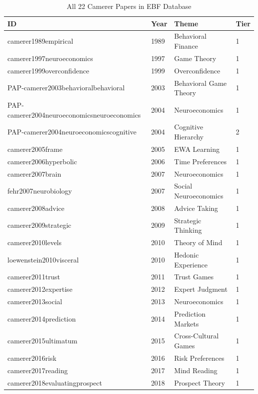 \begin{table}[htbp]
\centering
\caption{All 22 Camerer Papers in EBF Database}
\label{tab:ca-papers}
\renewcommand{\arraystretch}{1.2}
\scriptsize
\begin{tabular}{@{}llll@{}}
\toprule
\textbf{ID} & \textbf{Year} & \textbf{Theme} & \textbf{Tier} \\
\midrule
camerer1989empirical & 1989 & Behavioral Finance & 1 \\
camerer1997neuroeconomics & 1997 & Game Theory & 1 \\
camerer1999overconfidence & 1999 & Overconfidence & 1 \\
PAP-camerer2003behavioralbehavioral & 2003 & Behavioral Game Theory & 1 \\
PAP-camerer2004neuroeconomicsneuroeconomics & 2004 & Neuroeconomics & 1 \\
PAP-camerer2004neuroeconomicscognitive & 2004 & Cognitive Hierarchy & 2 \\
camerer2005frame & 2005 & EWA Learning & 1 \\
camerer2006hyperbolic & 2006 & Time Preferences & 1 \\
camerer2007brain & 2007 & Neuroeconomics & 1 \\
fehr2007neurobiology & 2007 & Social Neuroeconomics & 1 \\
camerer2008advice & 2008 & Advice Taking & 1 \\
camerer2009strategic & 2009 & Strategic Thinking & 1 \\
camerer2010levels & 2010 & Theory of Mind & 1 \\
loewenstein2010visceral & 2010 & Hedonic Experience & 1 \\
camerer2011trust & 2011 & Trust Games & 1 \\
camerer2012expertise & 2012 & Expert Judgment & 1 \\
camerer2013social & 2013 & Neuroeconomics & 1 \\
camerer2014prediction & 2014 & Prediction Markets & 1 \\
camerer2015ultimatum & 2015 & Cross-Cultural Games & 1 \\
camerer2016risk & 2016 & Risk Preferences & 1 \\
camerer2017reading & 2017 & Mind Reading & 1 \\
camerer2018evaluatingprospect & 2018 & Prospect Theory & 1 \\
\bottomrule
\end{tabular}
\end{table}


